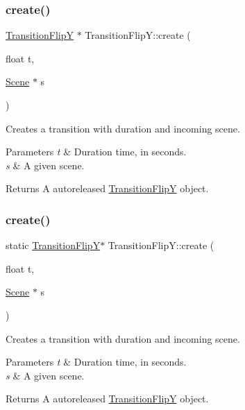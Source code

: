 \subsubsection{\texorpdfstring{create()}{create()}\hspace{0.1cm}{\footnotesize\ttfamily [3/4]}}
{\footnotesize\ttfamily \hyperlink{classTransitionFlipY}{Transition\+FlipY} $\ast$ Transition\+Flip\+Y\+::create (\begin{DoxyParamCaption}\item[{float}]{t,  }\item[{\hyperlink{classScene}{Scene} $\ast$}]{s }\end{DoxyParamCaption})\hspace{0.3cm}{\ttfamily [static]}}

Creates a transition with duration and incoming scene.


\begin{DoxyParams}{Parameters}
{\em t} & Duration time, in seconds. \\
\hline
{\em s} & A given scene. \\
\hline
\end{DoxyParams}
\begin{DoxyReturn}{Returns}
A autoreleased \hyperlink{classTransitionFlipY}{Transition\+FlipY} object. 
\end{DoxyReturn}
\mbox{\label{classTransitionFlipY_a5ddfa95d7eb98a1474f1f6caeb35ad91}} 
\subsubsection{\texorpdfstring{create()}{create()}\hspace{0.1cm}{\footnotesize\ttfamily [4/4]}}
{\footnotesize\ttfamily static \hyperlink{classTransitionFlipY}{Transition\+FlipY}$\ast$ Transition\+Flip\+Y\+::create (\begin{DoxyParamCaption}\item[{float}]{t,  }\item[{\hyperlink{classScene}{Scene} $\ast$}]{s }\end{DoxyParamCaption})\hspace{0.3cm}{\ttfamily [static]}}

Creates a transition with duration and incoming scene.


\begin{DoxyParams}{Parameters}
{\em t} & Duration time, in seconds. \\
\hline
{\em s} & A given scene. \\
\hline
\end{DoxyParams}
\begin{DoxyReturn}{Returns}
A autoreleased \hyperlink{classTransitionFlipY}{Transition\+FlipY} object. 
\end{DoxyReturn}
\mbox{\label{classTransitionFlipY_a51bbed9d1827d77df16747731fe17e00}} 
